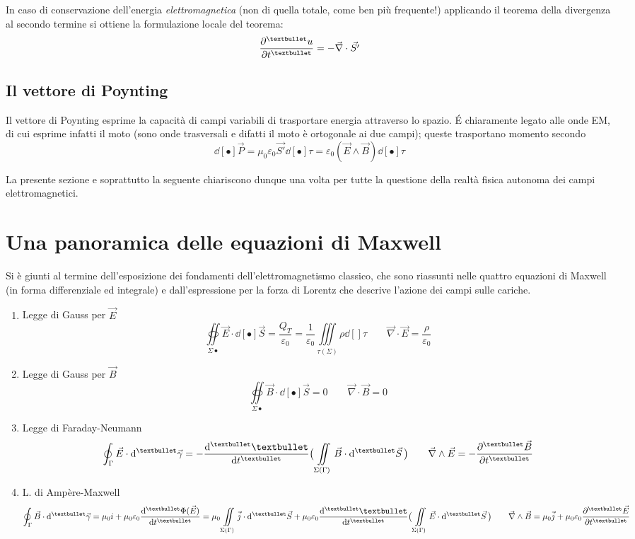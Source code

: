 In caso di conservazione dell'energia \textit{elettromagnetica} (non di quella totale, come ben più frequente!) applicando il teorema della divergenza al secondo termine si ottiene la formulazione locale del teorema:
\[\pdv[•]{u}{t} = - \vec{\nabla} \cdot \vec{S'}\]

\subsection{Il vettore di Poynting}

Il vettore di Poynting esprime la capacità di campi variabili di trasportare energia attraverso lo spazio. \'E chiaramente legato alle onde EM, di cui esprime infatti il moto (sono onde trasversali e difatti il moto è ortogonale ai due campi); queste trasportano momento secondo
\[\dd[•]{\vec{P}} = \mu_0 \varepsilon_0 \vec{S'} \dd[•]{\tau} = \varepsilon_0 (\vec{E} \wedge \vec{B}) \dd[•]{\tau}\]

La presente sezione e soprattutto la seguente chiariscono dunque una volta per tutte la questione della realtà fisica autonoma dei campi elettromagnetici.

\section{Una panoramica delle equazioni di Maxwell}
Si è giunti al termine dell'esposizione dei fondamenti dell'elettromagnetismo classico, che sono riassunti nelle quattro equazioni di Maxwell (in forma differenziale ed integrale) e dall'espressione per la forza di Lorentz che descrive l'azione dei campi sulle cariche.

\begin{enumerate}[label=\Roman*.]

\item Legge di Gauss per $\vec{E}$ 
\[\oiint\limits_{\Sigma •} \vec{E} \cdot \dd[•]{\vec{S}} = \frac{Q_T}{\varepsilon_0} = \frac{1}{\varepsilon_0} \iiint\limits_{\tau(\Sigma)} \rho \dd[]{\tau} \qquad \vec{\nabla} \cdot \vec{E} = \frac{\rho}{\varepsilon_0}\]

\item Legge di Gauss per $\vec{B}$ 
\[\oiint\limits_{\Sigma •} \vec{B} \cdot \dd[•]{\vec{S}} = 0 \qquad \vec{\nabla} \cdot \vec{B} = 0\]

\item Legge di Faraday-Neumann 
\[\oint_\Gamma \vec{E} \cdot \dd[•]{\vec{\gamma}} = - \dv[•]{•}{t} \big(\iint\limits_{\Sigma (\Gamma)} \vec{B} \cdot \dd[•]{\vec{S}}\big) \qquad \vec{\nabla} \wedge \vec{E} = - \pdv[•]{\vec{B}}{t}\]

\item L. di Ampère-Maxwell 
\[\oint_\Gamma \vec{B} \cdot \dd[•]{\vec{\gamma}} = \mu_0 i + \mu_0 \varepsilon_0 \dv[•]{\Phi(\vec{E})}{t} = \mu_0 \iint\limits_{\Sigma (\Gamma)} \vec{j} \cdot \dd[•]{\vec{S}} + \mu_0 \varepsilon_0 \dv[•]{•}{t} \big(\iint\limits_{\Sigma (\Gamma)} \vec{E} \cdot \dd[•]{\vec{S}}\big) \qquad \vec{\nabla} \wedge \vec{B} = \mu_0 \vec{j} + \mu_0 \varepsilon_0 \pdv[•]{\vec{E}}{t}\]

\end{enumerate}

